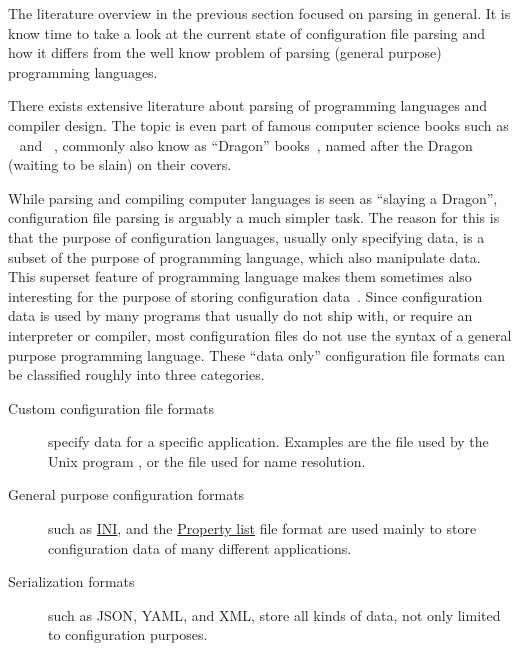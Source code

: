 The literature overview in the previous section focused on parsing in general. It is know time to take a look at the current state of configuration file parsing and how it differs from the well know problem of parsing (general purpose) programming languages.

There exists extensive literature about parsing of programming languages and compiler design. The topic is even part of famous computer science books such as ~\cite{ullman1977principles} and ~\cite{aho2006compilers}, commonly also know as “Dragon” books~\cite{parr2009language}, named after the Dragon (waiting to be slain) on their covers.

While parsing and compiling computer languages is seen as “slaying a Dragon”, configuration file parsing is arguably a much simpler task. The reason for this is that the purpose of configuration languages, usually only specifying data, is a subset of the purpose of programming language, which also manipulate data. This superset feature of programming language makes them sometimes also interesting for the purpose of storing configuration data~\cite{balmer2013lua}. Since configuration data is used by many programs that usually do not ship with, or require an interpreter or compiler, most configuration files do not use the syntax of a general purpose programming language. These “data only” configuration file formats can be classified roughly into three categories.

\begin{description}
  \item[Custom configuration file formats] specify data for a specific application. Examples are the \href{https://en.wikipedia.org/wiki/Fstab}{} file used by the Unix program , or the \href{https://en.wikipedia.org/wiki/https://en.wikipedia.org/wiki/Hosts_file}{} file used for name resolution.

  \item[General purpose configuration formats] such as \href{https://en.wikipedia.org/wiki/INI_file}{INI}, and the \href{https://en.wikipedia.org/wiki/Property_list}{Property list} file format are used mainly to store configuration data of many different applications.

  \item[Serialization formats] such as \gls{JSON}, \gls{YAML}, and \gls{XML}, store all kinds of data, not only limited to configuration purposes.
\end{description}

